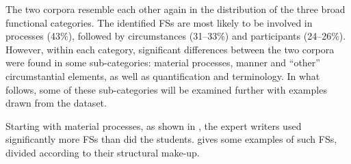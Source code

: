 \documentclass[output=paper]{langscibook}
\begin{document}
The two corpora resemble each other again in the distribution of the three broad functional categories. The identified FSs are most likely to be involved in processes (43\%), followed by circumstances (31--33\%) and participants (24--26\%). However, within each category, significant differences between the two corpora were found in some sub-categories: material processes, manner and ``other'' circumstantial elements, as well as quantification and terminology. In what follows, some of these sub-categories will be examined further with examples drawn from the dataset. 

Starting with material processes, as shown in , the expert writers used significantly more FSs than did the students.  gives some examples of such FSs, divided according to their structural make-up.
\end{document}
